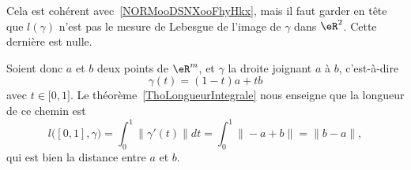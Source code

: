 \begin{remark}  \label{RemLongIntUn}
	Cela est cohérent avec~\ref{NORMooDSNXooFhyHkx}, mais il faut garder en tête que \( l(\gamma)\) n'est pas le mesure de Lebesgue de l'image de \( \gamma\) dans \( \eR^2\). Cette dernière est nulle.
\end{remark}

\begin{example}
	Soient donc \( a\) et \( b\) deux points de \( \eR^m\), et \( \gamma\) la droite joignant \( a\) à \( b\), c'est-à-dire
	\begin{equation}
		\gamma(t)=(1-t)a+tb
	\end{equation}
	avec \( t\in\mathopen[ 0 , 1 \mathclose]\). Le théorème~\ref{ThoLongueurIntegrale} nous enseigne que la longueur de ce chemin est
	\begin{equation}
		l\big( [0,1],\gamma \big)=\int_0^1\| \gamma'(t) \|dt=\int_0^1\| -a+b \|=\| b-a \|,
	\end{equation}
	qui est bien la distance entre \( a\) et \( b\).
\end{example}


